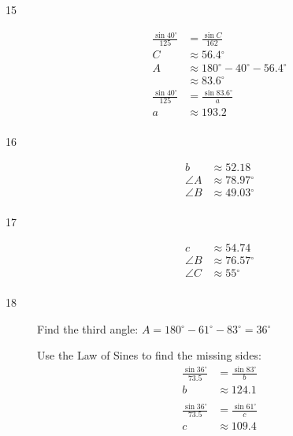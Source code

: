 \documentclass{exam}
\newcommand{\dg}{\ensuremath{^\circ}}
\begin{document}
\begin{description}
      \item[15]

        \begin{align*}
          \frac{\sin 40 \dg}{125} & = \frac{\sin C}{162} \\
          C                       & \approx 56.4 \dg \\
          A                       & \approx 180 \dg - 40 \dg - 56.4 \dg \\
                                  & \approx 83.6 \dg
          \\
          \frac{\sin 40 \dg}{125} & = \frac{\sin 83.6 \dg}{a} \\
          a                       & \approx 193.2 \\
        \end{align*}

      \item[16]
        \begin{align*}
          b        & \approx 52.18 \\
          \angle A & \approx 78.97 \dg \\
          \angle B & \approx 49.03 \dg \\
        \end{align*}

      \item[17]
        \begin{align*}
          c        & \approx 54.74 \\
          \angle B & \approx 76.57 \dg \\
          \angle C & \approx 55 \dg \\
        \end{align*}

      \item[18]
        Find the third angle: $A = 180 \dg - 61 \dg - 83 \dg = 36 \dg$

        Use the Law of Sines to find the missing sides:
        \begin{align*}
          \frac{\sin 36 \dg}{73.5} & = \frac{\sin 83 \dg}{b} \\
          b                        & \approx 124.1 \\
          \\
          \frac{\sin 36 \dg}{73.5} & = \frac{\sin 61 \dg}{c} \\
          c                        & \approx 109.4 \\
        \end{align*}


\end{description}
\end{document}
